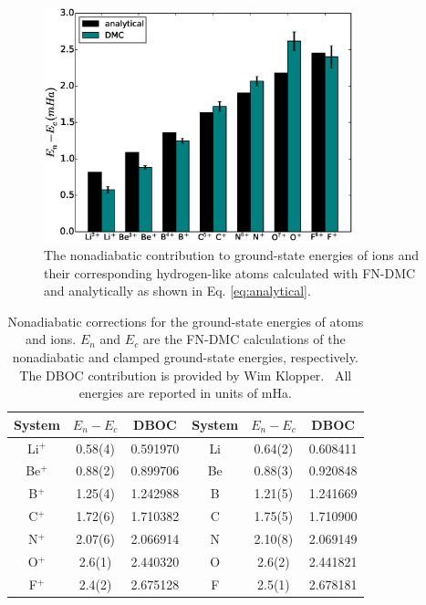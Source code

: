 \begin{figure}[h]
\includegraphics[width=0.8\textwidth]{analytical}
\caption{The nonadiabatic contribution to ground-state energies of ions and their corresponding hydrogen-like atoms calculated with FN-DMC and analytically as shown in Eq. \ref{eq:analytical}. \label{fig:analytical}}
\end{figure}

\begin{table}[h]
\setlength{\extrarowheight}{1pt}
\caption{Nonadiabatic corrections for the ground-state energies of atoms and ions. $E_n$ and $E_c$ are the FN-DMC calculations of the nonadiabatic and clamped ground-state energies, respectively. The DBOC contribution is provided by Wim Klopper.~\cite{klop1} All energies are reported in units of mHa.\label{tab:nad-ad-atoms}}
\begin{tabular}{ccc|ccc}
\hline\hline
System & $E_n-E_c$&  DBOC     & System & $E_n-E_c$&  DBOC \\ \hline
Li$^+$ &   0.58(4) &  0.591970 & Li     &   0.64(2) &  0.608411 \\
Be$^+$ &   0.88(2) &  0.899706 & Be     &   0.88(3) &  0.920848 \\
B$^+$  &   1.25(4) &  1.242988 & B      &   1.21(5) &  1.241669 \\
C$^+$  &   1.72(6) &  1.710382 & C      &   1.75(5) &  1.710900 \\
N$^+$  &   2.07(6) &  2.066914 & N      &   2.10(8) &  2.069149 \\
O$^+$  &   2.6(1) &  2.440320  & O      &   2.6(2)&  2.441821 \\
F$^+$  &   2.4(2) &  2.675128  & F      &   2.5(1)&  2.678181 \\
\hline\hline
\end{tabular}
\end{table}


